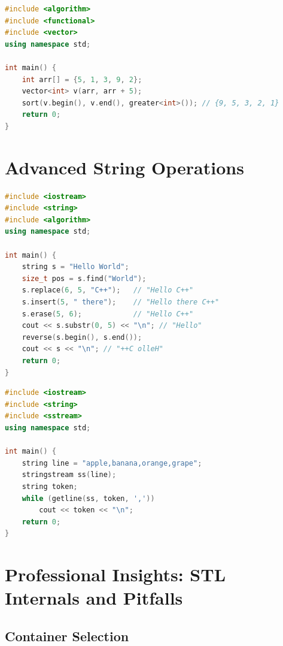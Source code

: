 \begin{lstlisting}[language=C++, caption={Standard functors from <functional>}]
#include <algorithm>
#include <functional>
#include <vector>
using namespace std;

int main() {
    int arr[] = {5, 1, 3, 9, 2};
    vector<int> v(arr, arr + 5);
    sort(v.begin(), v.end(), greater<int>()); // {9, 5, 3, 2, 1}
    return 0;
}
\end{lstlisting}

\section{Advanced String Operations}
\label{sec:string-advanced}

\begin{lstlisting}[language=C++, caption={String manipulation}]
#include <iostream>
#include <string>
#include <algorithm>
using namespace std;

int main() {
    string s = "Hello World";
    size_t pos = s.find("World");
    s.replace(6, 5, "C++");   // "Hello C++"
    s.insert(5, " there");    // "Hello there C++"
    s.erase(5, 6);            // "Hello C++"
    cout << s.substr(0, 5) << "\n"; // "Hello"
    reverse(s.begin(), s.end());
    cout << s << "\n"; // "++C olleH"
    return 0;
}
\end{lstlisting}

\begin{lstlisting}[language=C++, caption={C++98 string tokenisation}]
#include <iostream>
#include <string>
#include <sstream>
using namespace std;

int main() {
    string line = "apple,banana,orange,grape";
    stringstream ss(line);
    string token;
    while (getline(ss, token, ','))
        cout << token << "\n";
    return 0;
}
\end{lstlisting}

\section{Professional Insights: STL Internals and Pitfalls}
\label{sec:stl-pro-insights}

\subsection{Container Selection}

